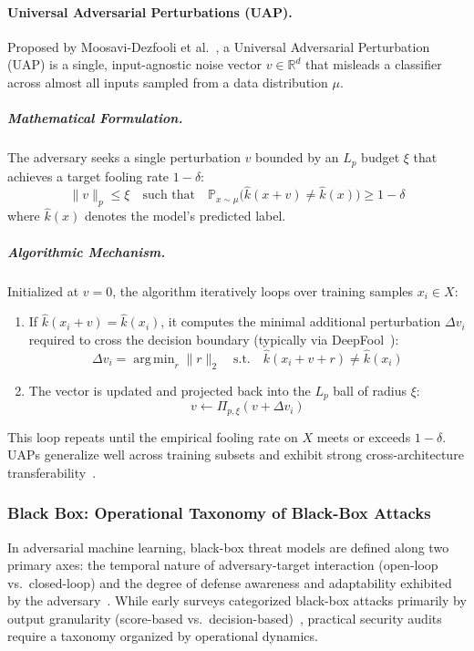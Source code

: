 \documentclass[12pt]{article}
\DeclareMathOperator*{\argmin}{arg\,min}
\begin{document}
\paragraph{Universal Adversarial Perturbations (UAP).} Proposed by Moosavi-Dezfooli et al.~\cite{moosavi2017}, a Universal Adversarial Perturbation (UAP) is a single, input-agnostic noise vector $v \in \mathbb{R}^d$ that misleads a classifier across almost all inputs sampled from a data distribution $\mu$.

\subparagraph{Mathematical Formulation.} The adversary seeks a single perturbation $v$ bounded by an $L_p$ budget $\xi$ that achieves a target fooling rate $1-\delta$:
\begin{equation}
  \lVert v \rVert_p \le \xi \quad \text{such that} \quad \mathbb{P}_{x \sim \mu}\big(\hat{k}(x+v) \neq \hat{k}(x)\big) \ge 1 - \delta
\end{equation}
where $\hat{k}(x)$ denotes the model's predicted label.

\subparagraph{Algorithmic Mechanism.} Initialized at $v = 0$, the algorithm iteratively loops over training samples $x_i \in X$:
\begin{enumerate}
  \item If $\hat{k}(x_i + v) = \hat{k}(x_i)$, it computes the minimal additional perturbation $\Delta v_i$ required to cross the decision boundary (typically via DeepFool~\cite{moosavi2016}):
  \begin{equation}
    \Delta v_i = \argmin_{r} \lVert r \rVert_2 \quad \text{s.t.} \quad \hat{k}(x_i + v + r) \neq \hat{k}(x_i)
  \end{equation}
  \item The vector is updated and projected back into the $L_p$ ball of radius $\xi$:
  \begin{equation}
    v \leftarrow \Pi_{p,\xi}(v + \Delta v_i)
  \end{equation}
\end{enumerate}
This loop repeats until the empirical fooling rate on $X$ meets or exceeds $1-\delta$. UAPs generalize well across training subsets and exhibit strong cross-architecture transferability~\cite{moosavi2017}.

\subsubsection{Black Box: Operational Taxonomy of Black-Box Attacks}

In adversarial machine learning, black-box threat models are defined along two primary axes: the temporal nature of adversary-target interaction (open-loop vs.\ closed-loop) and the degree of defense awareness and adaptability exhibited by the adversary~\cite{chakraborty2018,carlini2019}. While early surveys categorized black-box attacks primarily by output granularity (score-based vs.\ decision-based)~\cite{chakraborty2018}, practical security audits require a taxonomy organized by operational dynamics.
\end{document}
